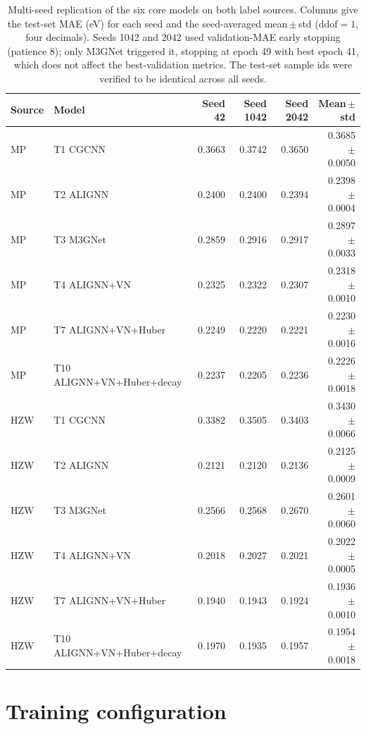 \documentclass[a4paper,10pt]{article}
\begin{document}
\begin{table}[htbp]
\centering
\caption{Multi-seed replication of the six core models on both label sources. Columns give the test-set MAE (eV) for each seed and the seed-averaged mean\,\(\pm\)\,std (\(\mathrm{ddof}=1\), four decimals). Seeds 1042 and 2042 used validation-MAE early stopping (patience 8); only M3GNet triggered it, stopping at epoch 49 with best epoch 41, which does not affect the best-validation metrics. The test-set sample ids were verified to be identical across all seeds.}
\label{tab:multiseed}
\scriptsize
\begin{tabular}{l l r r r r}
\toprule
Source & Model & Seed 42 & Seed 1042 & Seed 2042 & Mean\,\(\pm\)\,std \\
\midrule
MP  & T1 CGCNN                & 0.3663 & 0.3742 & 0.3650 & 0.3685 \(\pm\) 0.0050 \\
MP  & T2 ALIGNN               & 0.2400 & 0.2400 & 0.2394 & 0.2398 \(\pm\) 0.0004 \\
MP  & T3 M3GNet               & 0.2859 & 0.2916 & 0.2917 & 0.2897 \(\pm\) 0.0033 \\
MP  & T4 ALIGNN+VN            & 0.2325 & 0.2322 & 0.2307 & 0.2318 \(\pm\) 0.0010 \\
MP  & T7 ALIGNN+VN+Huber      & 0.2249 & 0.2220 & 0.2221 & 0.2230 \(\pm\) 0.0016 \\
MP  & T10 ALIGNN+VN+Huber+decay & 0.2237 & 0.2205 & 0.2236 & 0.2226 \(\pm\) 0.0018 \\
\midrule
HZW & T1 CGCNN                & 0.3382 & 0.3505 & 0.3403 & 0.3430 \(\pm\) 0.0066 \\
HZW & T2 ALIGNN               & 0.2121 & 0.2120 & 0.2136 & 0.2125 \(\pm\) 0.0009 \\
HZW & T3 M3GNet               & 0.2566 & 0.2568 & 0.2670 & 0.2601 \(\pm\) 0.0060 \\
HZW & T4 ALIGNN+VN            & 0.2018 & 0.2027 & 0.2021 & 0.2022 \(\pm\) 0.0005 \\
HZW & T7 ALIGNN+VN+Huber      & 0.1940 & 0.1943 & 0.1924 & 0.1936 \(\pm\) 0.0010 \\
HZW & T10 ALIGNN+VN+Huber+decay & 0.1970 & 0.1935 & 0.1957 & 0.1954 \(\pm\) 0.0018 \\
\bottomrule
\end{tabular}
\end{table}

\section{Training configuration}
\end{document}
